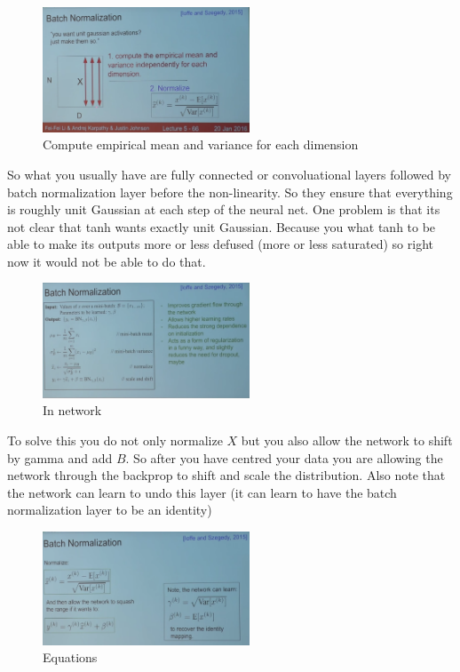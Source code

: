 \begin{figure}[h]
  \centering
  \includegraphics[width=0.55\textwidth]{Images/bn_layer/1.png}
  \caption{Compute empirical mean and variance for each dimension}
\end{figure}


So what you usually have are fully connected or convoluational layers followed by batch normalization layer before the non-linearity. So they ensure that everything is roughly unit Gaussian at each step of the neural net. One problem is that its not clear that tanh wants exactly unit Gaussian. Because you what tanh to be able to make its outputs more or less defused (more or less saturated) so right now it would not be able to do that.

\begin{figure}[h]
  \centering
  \includegraphics[width=0.55\textwidth]{Images/bn_layer/2.png}
  \caption{In network}
\end{figure}

To solve this you do not only normalize $X$ but you also allow the network to shift by gamma and add $B$. So after you have centred your data you are allowing the network through the backprop to shift and scale the distribution. Also note that the network can learn to undo this layer (it can learn to have the batch normalization layer to be an identity)

\begin{figure}[h]
  \centering
  \includegraphics[width=0.55\textwidth]{Images/bn_layer/3.png}
  \caption{Equations}
\end{figure}

